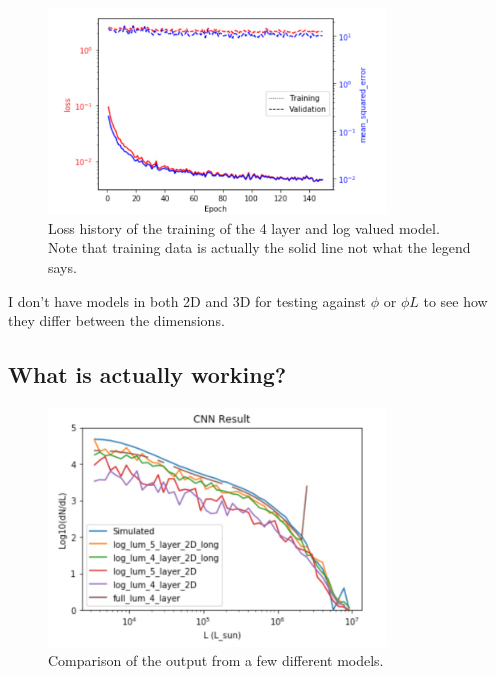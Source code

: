 \documentclass{article}
\begin{document}
			\begin{figure}[H]
				\centering
				\includegraphics[width=0.8\textwidth]{log_lum_4_layer_history.pdf}
				\caption{Loss history of the training of the 4 layer and log valued model.  Note that training data is actually the solid line not what the legend says.}
				\label{fig:log_lum_4_layer_history}
			\end{figure}

			I don't have models in both 2D and 3D for testing against \(\phi\) or \(\phi L\) to see how they differ between the dimensions.

		\subsection{What is actually working?} \label{sec:wiaw}

			\begin{figure}[H]
				\centering
				\includegraphics[width=0.8\textwidth]{compare_models.pdf}
				\caption{Comparison of the output from a few different models.}
				\label{fig:compare_models}
			\end{figure}
\end{document}

